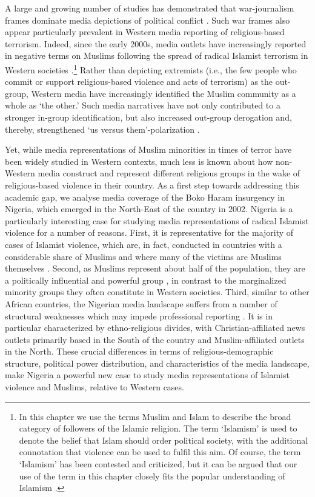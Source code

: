 A large and growing number of studies has demonstrated that war-journalism frames dominate media depictions of political conflict \citep[][p. 152]{Tenenboim-Weinblatt2016}. Such war frames also appear particularly prevalent in Western media reporting of religious-based terrorism. Indeed, since the early 2000s, media outlets have increasingly reported in negative terms on Muslims following the spread of radical Islamist terrorism in Western societies \citep{Ahmed2017}.\footnote{In this chapter we use the terms Muslim and Islam to describe the broad category of followers of the Islamic religion. The term `Islamism' is used to denote the belief that Islam should order political society, with the additional connotation that violence can be used to fulfil this aim. Of course, the term `Islamism' has been contested and criticized, but it can be argued that our use of the term in this chapter closely fits the popular understanding of Islamism \citep[see][]{Martin2010}.} Rather than depicting extremists (i.e., the few people who commit or support religious-based violence and acts of terrorism) as the out-group, Western media have increasingly identified the Muslim community as a whole as `the other.' Such media narratives have not only contributed to a stronger in-group identification, but also increased out-group derogation and, thereby, strengthened `us versus them'-polarization \citep[e.g.,][]{Choma2015, dawson2011, Kteily2015a, Lopes2015}.


Yet, while media representations of Muslim minorities in times of terror have been widely studied in Western contexts, much less is known about how non-Western media construct and represent different religious groups in the wake of religious-based violence in their country. As a first step towards addressing this academic gap, we analyse media coverage of the Boko Haram insurgency in Nigeria, which emerged in the North-East of the country in 2002. Nigeria is a particularly interesting case for studying media representations of radical Islamist violence for a number of reasons. First, it is representative for the majority of cases of Islamist violence, which are, in fact, conducted in countries with a considerable share of Muslims and where many of the victims are Muslims themselves \citep{TheInstituteforEconomicsandPeace2016}. Second, as Muslims represent about half of the population, they are a politically influential and powerful group \citep{Mustapha2009, Nnoli1996}, in contrast to the marginalized minority groups they often constitute in Western societies. Third, similar to other African countries, the Nigerian media landscape suffers from a number of structural weaknesses which may impede professional reporting \citep{Frere2001}. It is in particular characterized by ethno-religious divides, with Christian-affiliated news outlets primarily based in the South of the country and Muslim-affiliated outlets in the North. These crucial differences in terms of religious-demographic structure, political power distribution, and characteristics of the media landscape, make Nigeria a powerful new case to study media representations of Islamist violence and Muslims, relative to Western cases. 

